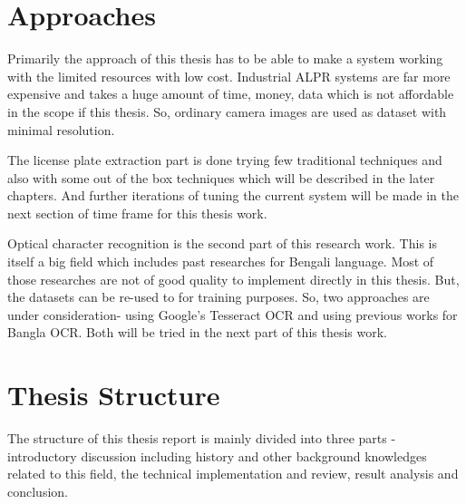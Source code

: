 \documentclass{standalone}
\begin{document}
\section{Approaches}
Primarily the approach of this thesis has to be able to make a system working with the limited resources with low cost. Industrial ALPR systems are far more expensive and takes a huge amount of time, money, data which is not affordable in the scope if this thesis. So, ordinary camera images are used as dataset with minimal resolution.

The license plate extraction part is done trying few traditional techniques and also with some out of the box techniques which will be described in the later chapters. And further iterations of tuning the current system will be made in the next section of time frame for this thesis work.

Optical character recognition is the second part of this research work. This is itself a big field which includes past researches for Bengali language. Most of those researches are not of good quality to implement directly in this thesis. But, the datasets can be re-used to for training purposes. So, two approaches are under consideration- using Google's Tesseract OCR and using previous works for Bangla OCR. Both will be tried in the next part of this thesis work. 

\section{Thesis Structure}
The structure of this thesis report is mainly divided into three parts - introductory discussion including history and other background knowledges related to this field, the technical implementation and review, result analysis and conclusion.
\end{document}

